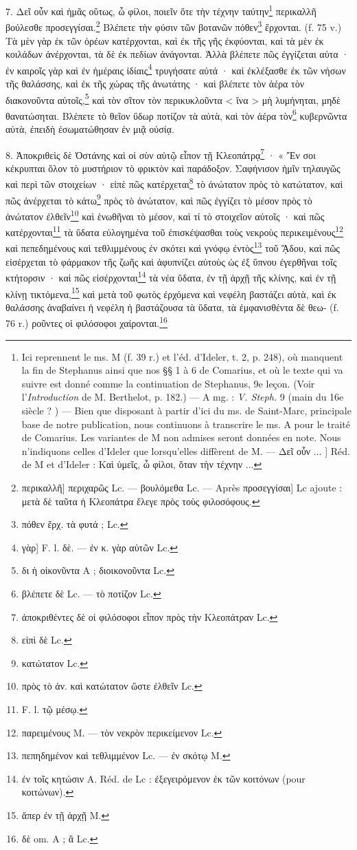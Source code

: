 \documentclass[a4paper, 11pt, oneside, polutonikogreek, french]{article}
\begin{document}
7. Δεῖ οὖν καὶ ἡμᾶς οὕτως, ὧ φίλοι, ποιεῖν ὅτε τὴν τέχνην ταύτην\footnote{Ici reprennent le ms. M (f. 39 r.) et l'éd. d'Ideler, t. 2, p. 248), où manquent la fin de Stephanus ainsi que nos §§ 1 à 6 de Comarius, et où le texte qui va suivre est donné comme la continuation de Stephanus, 9e leçon. (Voir l'\emph{Introduction} de M. Berthelot, p. 182.) --- A mg. : \emph{V. Steph.} 9 (main du 16e siècle ? ) --- Bien que disposant à partir d'ici du ms. de Saint-Marc, principale base de notre publication, nous continuons à transcrire le ms. A pour le traité de Comarius. Les variantes de M non admises seront données en note. Nous n'indiquons celles d'Ideler que lorsqu'elles diffèrent de M. --- Δεῖ οὗν ... ] Réd. de M et d'Ideler : Καὶ ὑμεῖς, ὦ φίλοι, ὅταν τὴν τέχνην ...} περικαλλῆ βούλεσθε προσεγγίσαι.\footnote{περικαλλῆ] περιχαρῶς Lc. --- βουλόμεθα Lc. --- Après προσεγγίσαι] Lc ajoute : μετὰ δὲ ταῦτα ἡ Κλεοπάτρα ἔλεγε πρὸς τοὺς φιλοσόφους.} Βλέπετε τὴν φύσιν τῶν βοτανῶν πόθεν\footnote{πόθεν ἔρχ. τὰ φυτά ; Lc.} ἔρχονται. (f. 75 v.) Τὰ μὲν γὰρ ἐκ τῶν ὀρέων κατέρχονται, καὶ ἐκ τῆς γῆς ἐκφύονται, καὶ τὰ μὲν ἐκ κοιλάδων ἀνέρχονται, τὰ δὲ ἐκ πεδίων ἀνάγονται. Ἀλλὰ βλέπετε πῶς ἐγγίζεται αὐτα · ἐν καιροῖς γὰρ καὶ ἐν ἡμέραις ἰδίαις\footnote{γὰρ] F. l. δὲ. --- ἐν κ. γὰρ αὐτῶν Lc.} τρυγήσατε αὐτά · καὶ ἐκλέξασθε ἐκ τῶν νήσων τῆς θαλάσσης, καὶ ἐκ τῆς χώρας τῆς ἀνωτάτης · καὶ βλέπετε τὸν ἀέρα τὸν διακονοῦντα αὐτοῖς,\footnote{δι ἡ οἰκονῦντα A ; διοικονοῦντα Lc.} καὶ τὸν σῖτον τὸν περικυκλοῦντα < ἵνα > μὴ λυμήνηται, μηδὲ θανατώσηται. Βλέπετε τὸ θεῖον ὕδωρ ποτίζον τὰ αὐτὰ, καὶ τὸν ἀέρα τὸν\footnote{βλέπετε δὲ Lc. --- τὸ ποτίζον Lc.} κυβερνῶντα αὐτὰ, ἐπειδὴ ἐσωματώθησαν ἐν μιᾷ οὐσίᾳ.

8. Ἀποκριθεὶς δὲ Ὀστάνης καὶ οἱ σὺν αὐτῷ εἶπον τῇ Κλεοπάτρᾳ\footnote{ἀποκριθέντες δὲ οἱ φιλόσοφοι εἶπον πρὸς τὴν Κλεοπάτραν Lc.} · « Ἔν σοι κέκρυπται ὅλον τὸ μυστήριον τὸ φρικτὸν καὶ παράδοξον. Σαφήνισον ἡμῖν τηλαυγῶς καὶ περὶ τῶν στοιχείων · εἰπὲ πῶς κατέρχεται\footnote{εἰπὶ δὲ Lc.} τὸ ἀνώτατον πρὸς τὸ κατώτατον, καὶ πῶς ἀνέρχεται τὸ κάτω\footnote{κατώτατον Lc.}     πρὸς τὸ ἀνώτατον, καὶ πῶς ἐγγίζει τὸ μέσον πρὸς τὸ ἀνώτατον ἐλθεῖν\footnote{πρὸς τὸ ἀν. καὶ κατώτατον ὥστε ἐλθεῖν Lc.} καὶ ἑνωθῆναι τὸ μέσον, καὶ τί τὸ στοιχεῖον αὐτοῖς · καὶ πῶς κατέρχονται\footnote{F. l. τῷ μέσῳ.} τὰ ὕδατα εὐλογημένα τοῦ ἐπισκέψασθαι τοὺς νεκροὺς περικειμένους\footnote{παρειμένους M. --- τὸν νεκρὸν περικείμενον Lc.} καὶ πεπεδημένους καὶ τεθλιμμένους ἐν σκότει καὶ γνόφῳ ἐντὸς\footnote{πεπηδημένον καὶ τεθλιμμένον Lc. --- ἐν σκότῳ M.} τοῦ ᾍδου, καὶ πῶς εἰσέρχεται τὸ φάρμακον τῆς ζωῆς καὶ ἀφυπνίζει αὐτοὺς ὡς ἐξ ὕπνου ἐγερθῆναι τοῖς κτήτορσιν · καὶ πῶς εἰσέρχονται\footnote{ἐν τοῖς κητώσιν A. Réd. de Lc : ἐξεγειρόμενον ἐκ τῶν κοιτόνων (pour κοιτώνων).} τὰ νέα ὕδατα, ἐν τῇ ἀρχῇ τῆς κλίνης, καὶ ἐν τῇ κλίνῃ τικτόμενα,\footnote{ἅπερ ἐν τῇ ἀρχῇ M.} καὶ μετὰ τοῦ φωτὸς ἐρχόμενα καὶ νεφέλη βαστάζει αὐτὰ, καὶ ἐκ θαλάσσης ἀναβαίνει ἡ νεφέλη ἡ βαστάζουσα τὰ ὕδατα, τὰ ἐμφανισθέντα δὲ θεω- (f. 76 r.) ροῦντες οἱ φιλόσοφοι χαίρονται.\footnote{δὲ om. A ; ἃ Lc.}
\end{document}
